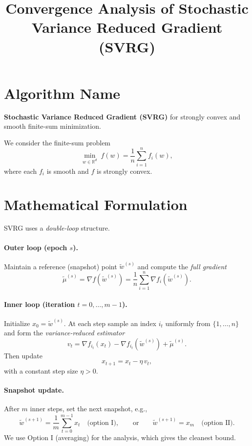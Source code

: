 \documentclass{article}
\title{Convergence Analysis of Stochastic Variance Reduced Gradient (SVRG)}
\author{}
\date{}
\begin{document}
\maketitle

\section*{Algorithm Name}
\textbf{Stochastic Variance Reduced Gradient (SVRG)} for strongly convex and smooth finite-sum minimization.

We consider the finite-sum problem
\[
\min_{w \in \mathbb{R}^d} \; f(w) = \frac{1}{n}\sum_{i=1}^n f_i(w),
\]
where each $f_i$ is smooth and $f$ is strongly convex.

\section*{Mathematical Formulation}

SVRG uses a \emph{double-loop} structure.

\paragraph{Outer loop (epoch $s$).}
Maintain a reference (snapshot) point $\tilde{w}^{(s)}$ and compute the \emph{full gradient}
\[
\tilde{\mu}^{(s)} = \nabla f(\tilde{w}^{(s)}) = \frac{1}{n}\sum_{i=1}^n \nabla f_i(\tilde{w}^{(s)}).
\]

\paragraph{Inner loop (iteration $t=0,\dots,m-1$).}
Initialize $x_0 = \tilde{w}^{(s)}$. At each step sample an index $i_t$ uniformly from $\{1,\dots,n\}$ and form the \emph{variance-reduced estimator}
\[
v_t = \nabla f_{i_t}(x_t) - \nabla f_{i_t}(\tilde{w}^{(s)}) + \tilde{\mu}^{(s)}.
\]
Then update
\[
x_{t+1} = x_t - \eta\, v_t,
\]
with a constant step size $\eta > 0$.

\paragraph{Snapshot update.}
After $m$ inner steps, set the next snapshot, e.g.,
\[
\tilde{w}^{(s+1)} = \frac{1}{m}\sum_{t=0}^{m-1} x_t \quad\text{(option I)}, \qquad
\text{or}\qquad \tilde{w}^{(s+1)} = x_m \quad\text{(option II)}.
\]
We use Option I (averaging) for the analysis, which gives the cleanest bound.
\end{document}
